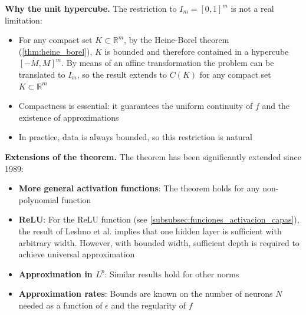 \textbf{Why the unit hypercube.}
The restriction to \(I_m = [0,1]^m\) is not a real limitation:
\begin{itemize}
	\item For any compact set \(K \subset \mathbb{R}^m\), by the Heine-Borel theorem (\autoref{thm:heine_borel}), \(K\) is bounded and therefore contained in a hypercube \([-M, M]^m\). By means of an affine transformation the problem can be translated to \(I_m\), so the result extends to \(C(K)\) for any compact set \(K \subset \mathbb{R}^m\)
	\item Compactness is essential: it guarantees the uniform continuity of \(f\) and the existence of approximations
	\item In practice, data is always bounded, so this restriction is natural
\end{itemize}

\textbf{Extensions of the theorem.}
The theorem has been significantly extended since 1989:
\begin{itemize}
	\item \textbf{More general activation functions}: The theorem holds for any non-polynomial function \citep{leshno1993multilayer}
	\item \textbf{ReLU}: For the \gls{ReLU} function (see \autoref{subsubsec:funciones_activacion_capas}), the result of Leshno et al. implies that one hidden layer is sufficient with arbitrary width. However, with bounded width, sufficient depth is required to achieve universal approximation \citep{lu2017expressive,hanin2019universal}
	\item \textbf{Approximation in \(L^p\)}: Similar results hold for other norms \citep{hornik1991approximation}
	\item \textbf{Approximation rates}: Bounds are known on the number of neurons \(N\) needed as a function of \(\epsilon\) and the regularity of \(f\) \citep{barron1993universal}
\end{itemize}

